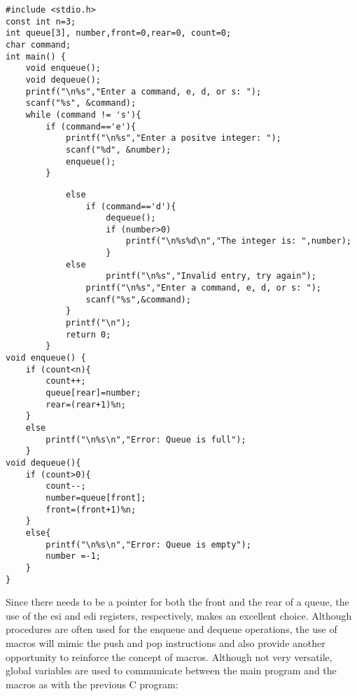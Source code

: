 \documentclass[10pt]{article}
\begin{document}
\begin{verbatim}
#include <stdio.h>
const int n=3;
int queue[3], number,front=0,rear=0, count=0;
char command;
int main() {
    void enqueue();
    void dequeue();
    printf("\n%s","Enter a command, e, d, or s: ");
    scanf("%s", &command);
    while (command != 's'){
        if (command=='e'){
            printf("\n%s","Enter a positve integer: ");
            scanf("%d", &number);
            enqueue();
        }
\end{verbatim}

\begin{verbatim}
            else
                if (command=='d'){
                    dequeue();
                    if (number>0)
                        printf("\n%s%d\n","The integer is: ",number);
                    }
            else
                    printf("\n%s","Invalid entry, try again");
                printf("\n%s","Enter a command, e, d, or s: ");
                scanf("%s",&command);
            }
            printf("\n");
            return 0;
        }
void enqueue() {
    if (count<n){
        count++;
        queue[rear]=number;
        rear=(rear+1)%n;
    }
    else
        printf("\n%s\n","Error: Queue is full");
    }
void dequeue(){
    if (count>0){
        count--;
        number=queue[front];
        front=(front+1)%n;
    }
    else{
        printf("\n%s\n","Error: Queue is empty");
        number =-1;
    }
}
\end{verbatim}

Since there needs to be a pointer for both the front and the rear of a queue, the use of the esi and edi registers, respectively, makes an excellent choice. Although procedures are often used for the enqueue and dequeue operations, the use of macros will mimic the push and pop instructions and also provide another opportunity to reinforce the concept of macros. Although not very versatile, global variables are used to communicate between the main program and the macros as with the previous C program:
\end{document}
